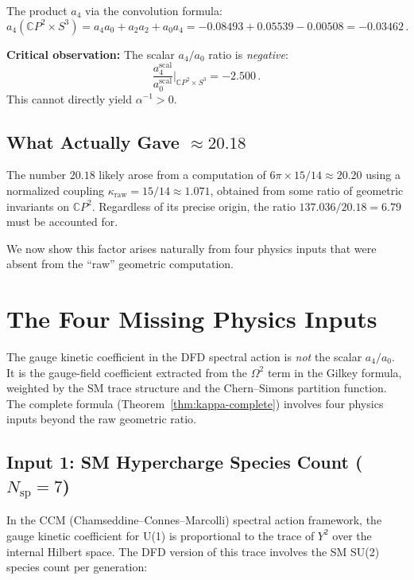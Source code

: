 \documentclass[12pt,a4paper]{article}
\theoremstyle{definition}
\begin{document}
The product $a_4$ via the convolution formula:
\begin{equation}
a_4(\mathbb{C}P^2 \times S^3) = a_4 a_0 + a_2 a_2 + a_0 a_4
= -0.08493 + 0.05539 - 0.00508 = -0.03462\,.
\end{equation}

\textbf{Critical observation:} The scalar $a_4/a_0$ ratio is
\emph{negative}:
\begin{equation}
\frac{a_4^{\mathrm{scal}}}{a_0^{\mathrm{scal}}}
\bigg|_{\mathbb{C}P^2 \times S^3} = -2.500\,.
\end{equation}
This cannot directly yield $\alpha^{-1} > 0$.

\subsection{What Actually Gave $\approx 20.18$}

The number $20.18$ likely arose from a computation of
$6\pi \times 15/14 \approx 20.20$ using a normalized coupling
$\kappa_{\mathrm{raw}} = 15/14 \approx 1.071$, obtained from some
ratio of geometric invariants on $\mathbb{C}P^2$.  Regardless of its
precise origin, the ratio $137.036/20.18 = 6.79$ must be accounted for.

We now show this factor arises naturally from four physics inputs that
were absent from the ``raw'' geometric computation.

\section{The Four Missing Physics Inputs}
\label{sec:four-inputs}

The gauge kinetic coefficient in the DFD spectral action is \emph{not}
the scalar $a_4/a_0$.  It is the gauge-field coefficient extracted from
the $\Omega^2$ term in the Gilkey formula, weighted by the SM trace
structure and the Chern--Simons partition function.  The complete formula
(Theorem~\ref{thm:kappa-complete}) involves four physics inputs beyond
the raw geometric ratio.

\subsection{Input 1: SM Hypercharge Species Count ($N_{\mathrm{sp}} = 7$)}
\label{sec:Nsp}

In the CCM (Chamseddine--Connes--Marcolli) spectral action framework, the
gauge kinetic coefficient for U(1) is proportional to the trace of $Y^2$
over the internal Hilbert space.  The DFD version of this trace involves
the SM SU(2) species count per generation:
\end{document}
